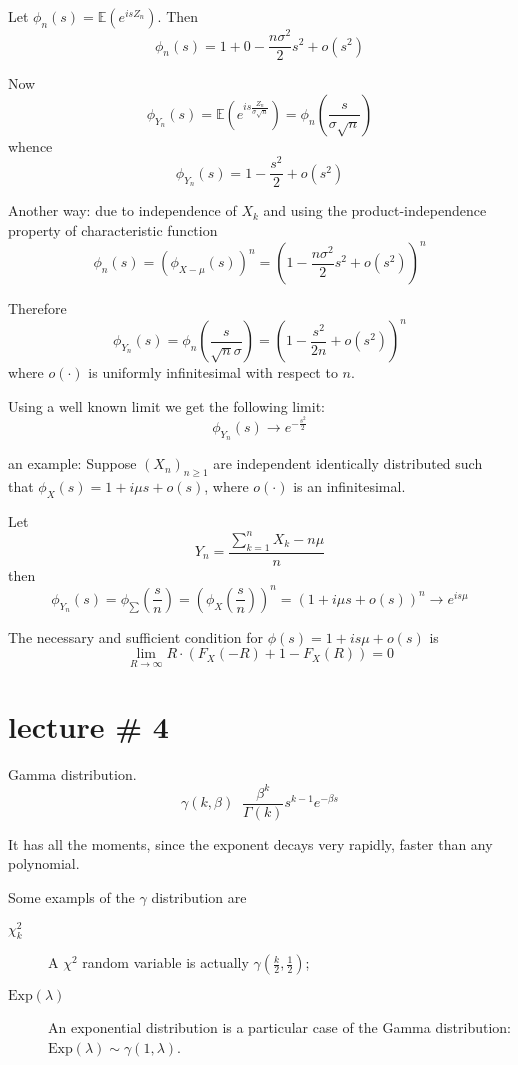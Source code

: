 \documentclass[a4paper]{article}
\newcommand{\brac}[1]{{\left ( #1 \right )}}
\newcommand{\Ex}{\mathbb{E}}
\newcommand{\defn}{\mathop{\overset{\Delta}{=}}\nolimits}
\begin{document}
Let $\phi_n(s) = \Ex\brac{e^{isZ_n}}$. Then
\[\phi_n(s) = 1 + 0 - \frac{n\sigma^2}{2} s^2 + o(s^2)\]

Now
\[\phi_{Y_n}(s) = \Ex\brac{e^{is\frac{Z_n}{\sigma \sqrt{n}}}} = \phi_n(\frac{s}{\sigma\sqrt{n}})\]
whence
\[\phi_{Y_n}(s) = 1 - \frac{s^2}{2} + o(s^2)\]


Another way: due to independence of $X_k$ and using the product-independence property of characteristic function
\[\phi_n(s) = \brac{\phi_{X-\mu}(s)}^n = \brac{ 1 - \frac{n\sigma^2}{2} s^2 + o(s^2) }^n\]

Therefore
\[\phi_{Y_n}(s) = \phi_n(\frac{s}{\sqrt{n}\sigma}) = \brac{ 1 - \frac{s^2}{2n} + o(s^2) }^n\]
 where $o(\cdot)$ is uniformly infinitesimal with respect to $n$.

Using a well known limit we get the following limit:
\[\phi_{Y_n}(s) \to e^{-\frac{s^2}{2}}\]

an example:
Suppose $\brac{X_n}_{n\geq1}$ are independent identically distributed such that $\phi_X(s) = 1+i\mu s + o(s)$, where $o(\cdot)$ is an infinitesimal.

Let \[Y_n = \frac{\sum_{k=1}^n X_k - n \mu }{n}\]
then
\[\phi_{Y_n}(s) = \phi_{\sum}(\frac{s}{n})
= \brac{\phi_X(\frac{s}{n})}^n = \brac{1+i\mu s + o(s)}^n
\to e^{is\mu}\]

The necessary and sufficient condition for $\phi(s) = 1+i s\mu+o(s)$ is \[\lim_{R\to\infty} R\cdot \brac{F_X(-R) + 1 - F_X(R)} = 0\]



\section{lecture \# 4} %
\label{sec:lecture_4}

Gamma distribution.
\[\gamma(k,\beta) \defn \frac{\beta^k}{\Gamma(k)} s^{k-1} e^{-\beta s}\]

It has all the moments, since the exponent decays very rapidly, faster than any polynomial.

Some exampls of the $\gamma$ distribution are \begin{description}
	\item[$\chi^2_k$] A $\chi^2$ random variable is actually $\gamma\brac{\frac{k}{2},\frac{1}{2}}$;
	\item[$\text{Exp}(\lambda)$] An exponential distribution is a particular case of the Gamma distribution: $\text{Exp}(\lambda) \sim \gamma(1,\lambda)$.
\end{description}
\end{document}
